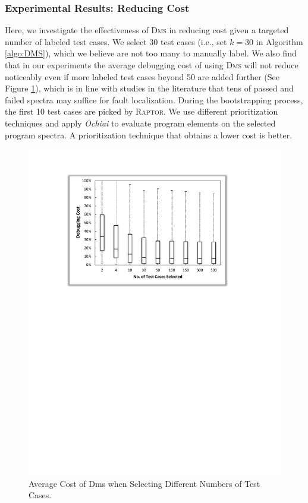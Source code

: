 \subsubsection{Experimental Results: Reducing Cost}\label{sec.exp.resultsB}

Here, we investigate the effectiveness of \textsc{Dms} in reducing cost given a targeted number of labeled test cases. We select 30 test cases (i.e., set $k=30$ in Algorithm \ref{algo:DMS}), which we believe are not too many to manually label. We also find that in our experiments the average debugging cost of using \textsc{Dms} will not reduce noticeably even if more labeled test cases beyond 50 are added further (See Figure \ref{Dms_boxplot}), which is in line with studies in the literature \cite[e.g.][]{Abreu:2009.jss,Libl+05} that tens of passed and failed spectra may suffice for fault localization. During the bootstrapping process, the first 10 test cases are picked by \textsc{Raptor}. We use different prioritization techniques and apply {\em Ochiai} to evaluate program elements on the selected program spectra. A prioritization technique that obtains a lower cost is better.

\begin{figure}[!htbp]
    \centering
    \includegraphics[width=12cm]{sdm_boxplot.pdf}
    \caption{Average Cost of {\sc Dms} when Selecting Different Numbers of Test Cases.}
    \label{Dms_boxplot}
\end{figure}

